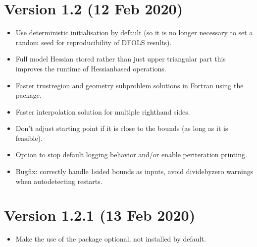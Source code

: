 \documentclass[letterpaper,10pt,english]{sphinxmanual}
\begin{document}
\section{Version 1.2 (12 Feb 2020)}
\label{\detokenize{history:version-1-2-12-feb-2020}}\begin{itemize}
\item {} 
\sphinxAtStartPar
Use deterministic initialisation by default (so it is no longer necessary to set a random seed for reproducibility of DFO\sphinxhyphen{}LS results).

\item {} 
\sphinxAtStartPar
Full model Hessian stored rather than just upper triangular part \sphinxhyphen{} this improves the runtime of Hessian\sphinxhyphen{}based operations.

\item {} 
\sphinxAtStartPar
Faster trust\sphinxhyphen{}region and geometry subproblem solutions in Fortran using the  package.

\item {} 
\sphinxAtStartPar
Faster interpolation solution for multiple right\sphinxhyphen{}hand sides.

\item {} 
\sphinxAtStartPar
Don’t adjust starting point if it is close to the bounds (as long as it is feasible).

\item {} 
\sphinxAtStartPar
Option to stop default logging behavior and/or enable per\sphinxhyphen{}iteration printing.

\item {} 
\sphinxAtStartPar
Bugfix: correctly handle 1\sphinxhyphen{}sided bounds as inputs, avoid divide\sphinxhyphen{}by\sphinxhyphen{}zero warnings when auto\sphinxhyphen{}detecting restarts.

\end{itemize}


\section{Version 1.2.1 (13 Feb 2020)}
\label{\detokenize{history:version-1-2-1-13-feb-2020}}\begin{itemize}
\item {} 
\sphinxAtStartPar
Make the use of the  package optional, not installed by default.

\end{itemize}
\end{document}
